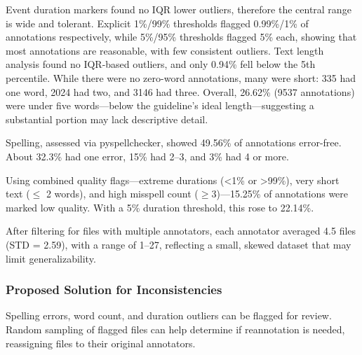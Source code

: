 \documentclass{article}
\begin{document}
Event duration markers found no IQR lower outliers, therefore the central range is wide and tolerant. Explicit 1\%/99\% thresholds flagged 0.99\%/1\% of annotations respectively, while 5\%/95\% thresholds flagged 5\% each, showing that most annotations are reasonable, with few consistent outliers. Text length analysis found no IQR-based outliers, and only 0.94\% fell below the 5th percentile. While there were no zero-word annotations, many were short: 335 had one word, 2024 had two, and 3146 had three. Overall, 26.62\% (9537 annotations) were under five words—below the guideline's ideal length—suggesting a substantial portion may lack descriptive detail.

\begin{table}[H]
  \caption{Word Count Outcomes}
  \label{tab:word_outcomes}
  \centering
\end{table}

Spelling, assessed via pyspellchecker, showed 49.56\% of annotations error-free. About 32.3\% had one error, 15\% had 2–3, and 3\% had 4 or more.

Using combined quality flags—extreme durations (<1\% or >99\%), very short text ($\leq$ 2 words), and high misspell count ($\geq$3)—15.25\% of annotations were marked low quality. With a 5\% duration threshold, this rose to 22.14\%.

After filtering for files with multiple annotators, each annotator averaged 4.5 files (STD = 2.59), with a range of 1–27, reflecting a small, skewed dataset that may limit generalizability.

\subsubsection{Proposed Solution for Inconsistencies}

Spelling errors, word count, and duration outliers can be flagged for review. Random sampling of flagged files can help determine if reannotation is needed, reassigning files to their original annotators.
\end{document}
